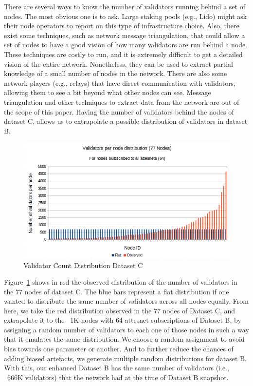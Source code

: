\documentclass[conference]{IEEEtran}
\begin{document}
There are several ways to know the number of validators running behind a set of nodes. The most obvious one is to ask. Large staking pools (e.g., Lido) might ask their node operators to report on this type of infrastructure choice. Also, there exist some techniques, such as network message triangulation, that could allow a set of nodes to have a good vision of how many validators are run behind a node. These techniques are costly to run, and it is extremely difficult to get a detailed vision of the entire network. Nonetheless, they can be used to extract partial knowledge of a small number of nodes in the network. There are also some network players (e.g., relays) that have direct communication with validators, allowing them to see a bit beyond what other nodes can see. Message triangulation and other techniques to extract data from the network are out of the scope of this paper. Having the number of validators behind the nodes of dataset C, allows us to extrapolate a possible distribution of validators in dataset B.

\begin{figure}
    \centering
    \includegraphics[width=0.95\linewidth]{figures/dist77.png}
    \caption{Validator Count Distribution Dataset C}
    \label{fig:datac}
\end{figure}

Figure~\ref{fig:datac} shows in red the observed distribution of the number of validators in the 77 nodes of dataset C. The blue bars represent a flat distribution if one wanted to distribute the same number of validators across all nodes equally. From here, we take the red distribution observed in the 77 nodes of Dataset C, and extrapolate it to the ~1K nodes with 64 attesnet subscriptions of Dataset B, by assigning a random number of validators to each one of those nodes in such a way that it emulates the same distribution. We choose a random assignment to avoid bias towards one parameter or another. And to further reduce the chances of adding biased artefacts, we generate multiple random distributions for dataset B. With this, our enhanced Dataset B has the same number of validators (i.e., ~666K validators) that the network had at the time of Dataset B snapshot.
\end{document}
